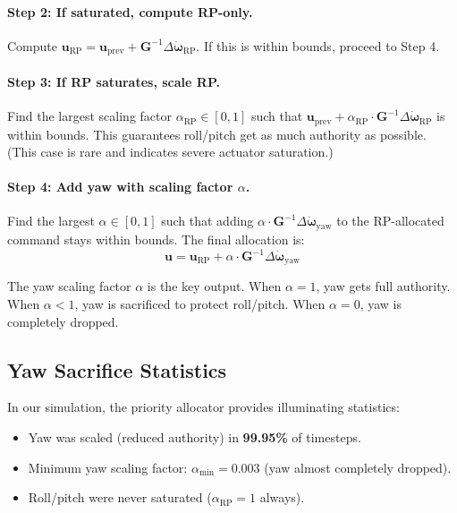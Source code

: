 \documentclass[12pt, a4paper]{article}
\newcommand{\bu}{\bm{u}}
\newcommand{\bomega}{\bm{\omega}}
\begin{document}
\paragraph{Step 2: If saturated, compute RP-only.}  Compute $\bu_{\text{RP}} = \bu_{\text{prev}} + \bm{G}^{-1} \Delta\dot{\bomega}_{\text{RP}}$.  If this is within bounds, proceed to Step 4.

\paragraph{Step 3: If RP saturates, scale RP.}  Find the largest scaling factor $\alpha_{\text{RP}} \in [0, 1]$ such that $\bu_{\text{prev}} + \alpha_{\text{RP}} \cdot \bm{G}^{-1} \Delta\dot{\bomega}_{\text{RP}}$ is within bounds.  This guarantees roll/pitch get as much authority as possible.  (This case is rare and indicates severe actuator saturation.)

\paragraph{Step 4: Add yaw with scaling factor $\alpha$.}  Find the largest $\alpha \in [0, 1]$ such that adding $\alpha \cdot \bm{G}^{-1} \Delta\dot{\bomega}_{\text{yaw}}$ to the RP-allocated command stays within bounds.  The final allocation is:
\begin{equation}
    \bu = \bu_{\text{RP}} + \alpha \cdot \bm{G}^{-1} \Delta\dot{\bomega}_{\text{yaw}}
\end{equation}

The yaw scaling factor $\alpha$ is the key output.  When $\alpha = 1$, yaw gets full authority.  When $\alpha < 1$, yaw is sacrificed to protect roll/pitch.  When $\alpha = 0$, yaw is completely dropped.

\subsection{Yaw Sacrifice Statistics}

In our simulation, the priority allocator provides illuminating statistics:
\begin{itemize}
    \item Yaw was scaled (reduced authority) in \textbf{99.95\%} of timesteps.
    \item Minimum yaw scaling factor: $\alpha_{\min} = 0.003$ (yaw almost completely dropped).
    \item Roll/pitch were never saturated ($\alpha_{\text{RP}} = 1$ always).
\end{itemize}
\end{document}
